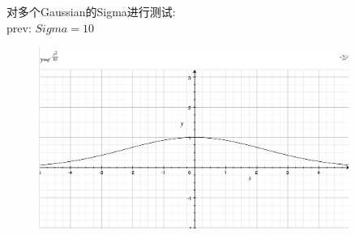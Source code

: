 \documentclass{beamer}
\begin{document}
  \begin{frame}
    对多个Gaussian的Sigma进行测试:\\
    prev: $Sigma = 10$
    \begin{figure}
      \centering
      \includegraphics[width=0.9\textwidth]{Nov-16/fig7.png}
    \end{figure}
  \end{frame}
  
\end{document}
